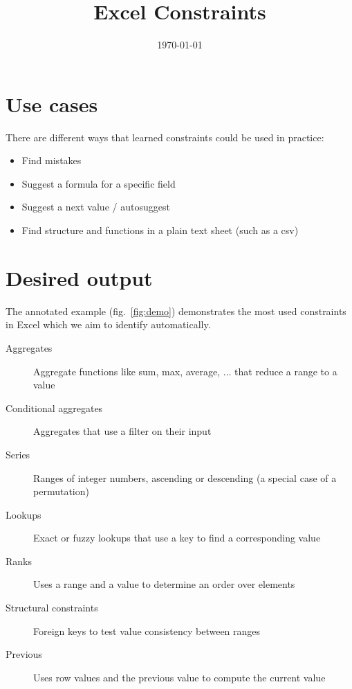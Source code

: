 \documentclass[a4paper]{article}
\title{Excel Constraints}
\date{\today}
\begin{document}
\maketitle


\section{Use cases} %
\label{sec:use_cases}
There are different ways that learned constraints could be used in practice:

\begin{itemize}
	\item Find mistakes
	\item Suggest a formula for a specific field
	\item Suggest a next value / autosuggest
	\item Find structure and functions in a plain text sheet (such as a csv)
\end{itemize}


\section{Desired output} %
\label{sec:demo_example}
The annotated example (fig.~\ref{fig:demo}) demonstrates the most used constraints in Excel which we aim to identify automatically.

\begin{description}
	\item[Aggregates] Aggregate functions like sum, max, average, ... that reduce a range to a value
	\item[Conditional aggregates] Aggregates that use a filter on their input
	\item[Series] Ranges of integer numbers, ascending or descending (a special case of a permutation)
	\item[Lookups] Exact or fuzzy lookups that use a key to find a corresponding value
	\item[Ranks] Uses a range and a value to determine an order over elements
	\item[Structural constraints] Foreign keys to test value consistency between ranges
	\item[Previous] Uses row values and the previous value to compute the current value
\end{description}
\end{document}
